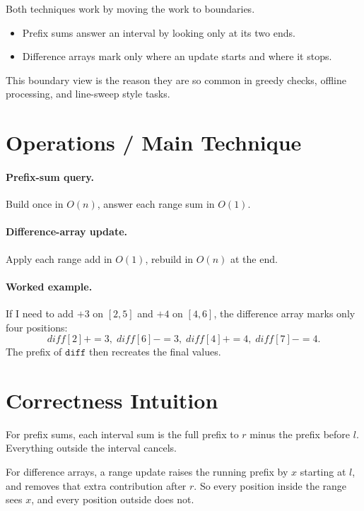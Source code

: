 Both techniques work by moving the work to boundaries.

\begin{itemize}
  \item Prefix sums answer an interval by looking only at its two ends.
  \item Difference arrays mark only where an update starts and where it stops.
\end{itemize}

This boundary view is the reason they are so common in greedy checks, offline processing, and line-sweep style tasks.

\section*{Operations / Main Technique}

\paragraph{Prefix-sum query.}
Build once in \(O(n)\), answer each range sum in \(O(1)\).

\paragraph{Difference-array update.}
Apply each range add in \(O(1)\), rebuild in \(O(n)\) at the end.

\paragraph{Worked example.}
If I need to add \(+3\) on \([2, 5]\) and \(+4\) on \([4, 6]\), the difference array marks only four positions:
\[
diff[2] += 3, \; diff[6] -= 3, \; diff[4] += 4, \; diff[7] -= 4.
\]
The prefix of \(\texttt{diff}\) then recreates the final values.

\section*{Correctness Intuition}

For prefix sums, each interval sum is the full prefix to \(r\) minus the prefix before \(l\). Everything outside the
interval cancels.

For difference arrays, a range update raises the running prefix by \(x\) starting at \(l\), and removes that extra
contribution after \(r\). So every position inside the range sees \(x\), and every position outside does not.

